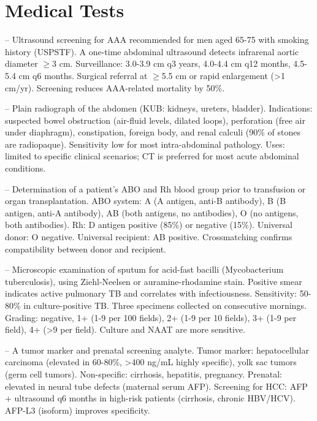 \chapter{Medical Tests}

-- Ultrasound screening for AAA recommended for men aged 65-75 with smoking history (USPSTF). A one-time abdominal ultrasound detects infrarenal aortic diameter \(\ge\)3 cm. Surveillance: 3.0-3.9 cm q3 years, 4.0-4.4 cm q12 months, 4.5-5.4 cm q6 months. Surgical referral at \(\ge\)5.5 cm or rapid enlargement (>1 cm/yr). Screening reduces AAA-related mortality by 50\%.

-- Plain radiograph of the abdomen (KUB: kidneys, ureters, bladder). Indications: suspected bowel obstruction (air-fluid levels, dilated loops), perforation (free air under diaphragm), constipation, foreign body, and renal calculi (90\% of stones are radiopaque). Sensitivity low for most intra-abdominal pathology. Uses: limited to specific clinical scenarios; CT is preferred for most acute abdominal conditions.

-- Determination of a patient's ABO and Rh blood group prior to transfusion or organ transplantation. ABO system: A (A antigen, anti-B antibody), B (B antigen, anti-A antibody), AB (both antigens, no antibodies), O (no antigens, both antibodies). Rh: D antigen positive (85\%) or negative (15\%). Universal donor: O negative. Universal recipient: AB positive. Crossmatching confirms compatibility between donor and recipient.

-- Microscopic examination of sputum for acid-fast bacilli (Mycobacterium tuberculosis), using Ziehl-Neelsen or auramine-rhodamine stain. Positive smear indicates active pulmonary TB and correlates with infectiousness. Sensitivity: 50-80\% in culture-positive TB. Three specimens collected on consecutive mornings. Grading: negative, 1+ (1-9 per 100 fields), 2+ (1-9 per 10 fields), 3+ (1-9 per field), 4+ (>9 per field). Culture and NAAT are more sensitive.

-- A tumor marker and prenatal screening analyte. Tumor marker: hepatocellular carcinoma (elevated in 60-80\%, >400 ng/mL highly specific), yolk sac tumors (germ cell tumors). Non-specific: cirrhosis, hepatitis, pregnancy. Prenatal: elevated in neural tube defects (maternal serum AFP). Screening for HCC: AFP + ultrasound q6 months in high-risk patients (cirrhosis, chronic HBV/HCV). AFP-L3 (isoform) improves specificity.

